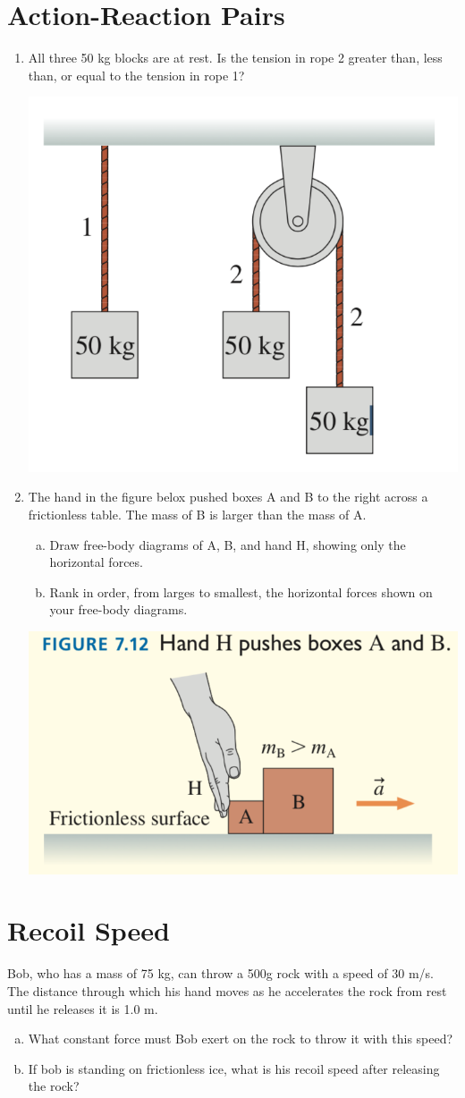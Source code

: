 \documentclass[10pt]{article}
\begin{document}
\section{Action-Reaction Pairs}
\begin{enumerate}
	


\item All three 50 kg blocks are at rest. Is the tension in rope 2 greater than, less than, or equal to the tension in rope 1?
	\begin{center}
	\includegraphics[width=.2\linewidth]{PS5-FigB}
 \end{center}
\item The hand in the figure belox pushed boxes A and B to the right across a frictionless table. The mass of B is larger than the mass of A.
 
\begin{enumerate}[(a)]
	\item Draw free-body diagrams of A, B, and hand H, showing only the horizontal forces.
	\item Rank in order, from larges to smallest, the horizontal forces shown on your free-body diagrams. 
\end{enumerate}

\begin{center}
	
\includegraphics[width=.2\linewidth]{PS5-FigC}
\end{center}


\end{enumerate}

\section{Recoil Speed}
Bob, who has a mass of 75 kg, can throw a 500g rock with a speed of 30 m/s. The distance through which his hand moves as he accelerates the rock from rest until he releases it is 1.0 m.

\begin{enumerate}[(a)]
	\item What constant force must Bob exert on the rock to throw it with this speed?
	
	\item If bob is standing on frictionless ice, what is his recoil speed after releasing the rock?
	
\end{enumerate}
\end{document}
